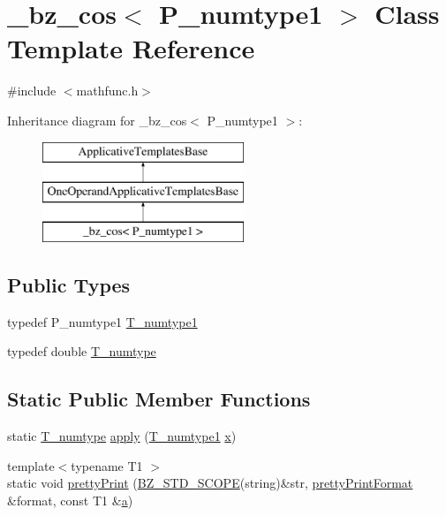 \hypertarget{class__bz__cos}{}\section{\+\_\+bz\+\_\+cos$<$ P\+\_\+numtype1 $>$ Class Template Reference}
\label{class__bz__cos}


{\ttfamily \#include $<$mathfunc.\+h$>$}

Inheritance diagram for \+\_\+bz\+\_\+cos$<$ P\+\_\+numtype1 $>$\+:\begin{figure}[H]
\begin{center}
\leavevmode
\includegraphics[height=3.000000cm]{class__bz__cos}
\end{center}
\end{figure}
\subsection*{Public Types}
\begin{DoxyCompactItemize}
\item 
typedef P\+\_\+numtype1 \hyperlink{class__bz__cos_af82219d68bb98957b427ec0e6dc07d08}{T\+\_\+numtype1}
\item 
typedef double \hyperlink{class__bz__cos_a2fa503482dbe3ed4b41d92f501aaa254}{T\+\_\+numtype}
\end{DoxyCompactItemize}
\subsection*{Static Public Member Functions}
\begin{DoxyCompactItemize}
\item 
static \hyperlink{class__bz__cos_a2fa503482dbe3ed4b41d92f501aaa254}{T\+\_\+numtype} \hyperlink{class__bz__cos_a792d5abc2c958f118b55fcafb09d5d3c}{apply} (\hyperlink{class__bz__cos_af82219d68bb98957b427ec0e6dc07d08}{T\+\_\+numtype1} \hyperlink{vecnorm1_8cc_ac73eed9e41ec09d58f112f06c2d6cb63}{x})
\item 
{\footnotesize template$<$typename T1 $>$ }\\static void \hyperlink{class__bz__cos_a0ba1fbba9f506d738b8f5235fac27519}{pretty\+Print} (\hyperlink{numinquire_8h_a2b24ffc3b4ef9803956bc7715c6c7b83}{B\+Z\+\_\+\+S\+T\+D\+\_\+\+S\+C\+O\+P\+E}(string)\&str, \hyperlink{classprettyPrintFormat}{pretty\+Print\+Format} \&format, const T1 \&\hyperlink{gen__mat5files_8m_aae328bf20413f220e38aec4d95bfd6da}{a})
\end{DoxyCompactItemize}


